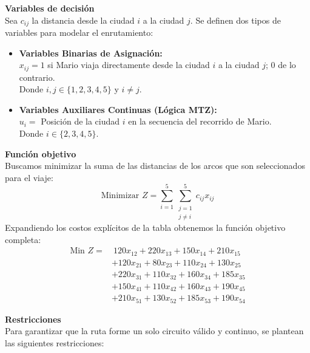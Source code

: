 \documentclass[10pt,a4paper]{article}
\begin{document}
\vspace{3mm}
\textbf{Variables de decisión}\\
Sea $c_{ij}$ la distancia desde la ciudad $i$ a la ciudad $j$. Se definen dos tipos de variables para modelar el enrutamiento:
\begin{itemize}
    \item \textbf{Variables Binarias de Asignación:} \\
    $x_{ij} = 1$ si Mario viaja directamente desde la ciudad $i$ a la ciudad $j$; $0$ de lo contrario. \\
    Donde $i, j \in \{1, 2, 3, 4, 5\}$ y $i \neq j$.
    
    \item \textbf{Variables Auxiliares Continuas (Lógica MTZ):} \\
    $u_i =$ Posición de la ciudad $i$ en la secuencia del recorrido de Mario. \\
    Donde $i \in \{2, 3, 4, 5\}$.
\end{itemize}

\vspace{3mm}
\textbf{Función objetivo}\\
Buscamos minimizar la suma de las distancias de los arcos que son seleccionados para el viaje:
\[ \text{Minimizar } Z = \sum_{i=1}^{5} \sum_{\substack{j=1 \\ j \neq i}}^{5} c_{ij} x_{ij} \]
Expandiendo los costos explícitos de la tabla obtenemos la función objetivo completa:
\begin{align*}
\text{Min } Z = & \ 120x_{12} + 220x_{13} + 150x_{14} + 210x_{15} \\
                & + 120x_{21} + 80x_{23} + 110x_{24} + 130x_{25} \\
                & + 220x_{31} + 110x_{32} + 160x_{34} + 185x_{35} \\
                & + 150x_{41} + 110x_{42} + 160x_{43} + 190x_{45} \\
                & + 210x_{51} + 130x_{52} + 185x_{53} + 190x_{54}
\end{align*}

\vspace{3mm}
\textbf{Restricciones}\\
Para garantizar que la ruta forme un solo circuito válido y continuo, se plantean las siguientes restricciones:
\end{document}
